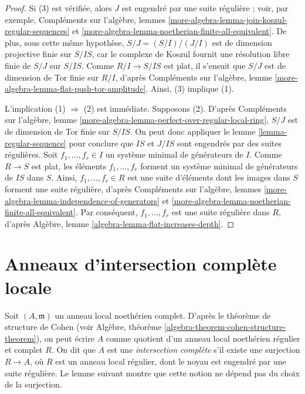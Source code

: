 \begin{proof}
Si (3) est vérifiée, alors $J$ est engendré par une suite régulière ; voir,
par exemple, Compléments sur l'algèbre, lemmes
\ref{more-algebra-lemma-join-koszul-regular-sequences} et
\ref{more-algebra-lemma-noetherian-finite-all-equivalent}.
De plus, sous cette même hypothèse, $S/J = (S/I)/(J/I)$
est de dimension projective finie sur $S/IS$, car le complexe de Koszul
fournit une résolution libre finie de $S/J$ sur $S/IS$.
Comme $R/I \to S/IS$ est plat, il s'ensuit que $S/J$ est de dimension
de Tor finie sur $R/I$, d'après
Compléments sur l'algèbre, lemme
\ref{more-algebra-lemma-flat-push-tor-amplitude}.
Ainsi, (3) implique (1).

\medskip\noindent
L'implication (1) $\Rightarrow$ (2) est immédiate.
Supposons (2). D'après
Compléments sur l'algèbre, lemme
\ref{more-algebra-lemma-perfect-over-regular-local-ring},
$S/J$ est de dimension de Tor finie sur $S/IS$.
On peut donc appliquer le lemme \ref{lemma-regular-sequence}
pour conclure que $IS$ et $J/IS$ sont engendrés par des suites régulières.
Soit $f_1, \ldots, f_r \in I$ un système minimal de générateurs de $I$.
Comme $R \to S$ est plat, les éléments $f_1, \ldots, f_r$ forment un système
minimal de générateurs de $IS$ dans $S$. Ainsi, $f_1, \ldots, f_r \in R$
est une suite d'éléments dont les images dans $S$ forment une suite régulière,
d'après Compléments sur l'algèbre, lemmes
\ref{more-algebra-lemma-independence-of-generators} et
\ref{more-algebra-lemma-noetherian-finite-all-equivalent}.
Par conséquent, $f_1, \ldots, f_r$ est une suite régulière dans $R$,
d'après Algèbre, lemme \ref{algebra-lemma-flat-increases-depth}.
\end{proof}





\section{Anneaux d'intersection complète locale}
\label{section-lci}

\noindent
Soit $(A, \mathfrak m)$ un anneau local noethérien complet.
D'après le théorème de structure de Cohen (voir
Algèbre, théorème \ref{algebra-theorem-cohen-structure-theorem}),
on peut écrire $A$ comme quotient d'un anneau local noethérien
régulier et complet $R$. On dit que $A$ est une
{\it intersection complète}
s'il existe une surjection $R \to A$,
où $R$ est un anneau local régulier, dont le noyau
est engendré par une suite régulière.
Le lemme suivant montre que cette notion ne dépend pas
du choix de la surjection.

